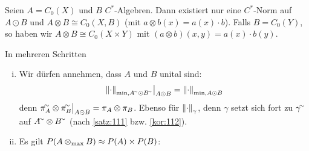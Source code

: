 \begin{satz}[{name={Takesaki}},label=satz:121]
	Seien $A =C_0(X)$ und $B$ $C^*$-Algebren.
	Dann existiert nur eine $C^*$-Norm auf $A \odot B$ und $A \otimes B \cong C_0(X,B)$ (mit $a \otimes b(x) = a(x) \cdot b$).
	Falls $B=C_0(Y)$, so haben wir $A \otimes B \cong C_0(X \times Y)$ mit $(a \otimes b)(x,y)=a(x) \cdot b(y)$.
\end{satz}
\begin{beweis}
	In mehreren Schritten
	\begin{enumerate}[(i)]
		\item Wir dürfen annehmen, dass $A$ und $B$ unital sind: 
		\[
			\norm*{\cdot }_{\min, A^\simm \odot B^\simm}\big|_{A \odot B} = \norm*{\cdot }_{\min, A \odot B}
		\]
		denn $\pi_A^\simm \otimes \pi_B^\simm\big|_{A \odot B} = \pi_A \otimes \pi_B$.
		Ebenso für $\norm*{\cdot }_\gamma$, denn $\gamma$ setzt sich fort zu $\gamma^\simm$ auf $A^\simm \otimes B^\simm$ (nach \autoref{satz:111} bzw. \autoref{kor:112}).
		\item Es gilt $P(A \tensormax B) \approx P(A) \times P(B)$:
		

\end{enumerate}
\end{beweis}
